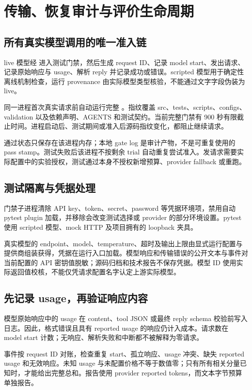 \section{传输、恢复审计与评价生命周期}
\subsection{所有真实模型调用的唯一准入链}
live 模型经  进入测试门禁，然后生成 request ID、记录 model start、发出请求、记录原始响应与 usage、解析 reply 并记录成功或错误。scripted 模型用于确定性离线机制检查，运行 provenance 由实际模型类型核验，不能通过文字字段伪装为 live。

同一进程首次真实请求前自动运行完整 。指纹覆盖 src、tests、scripts、configs、validation 以及依赖声明、AGENTS 和测试契约。当前完整门禁有 900 秒有限截止时间。进程启动后、测试期间或准入后源码指纹变化，都阻止继续请求。

通过状态只保存在该进程内存；本地 gate log 是审计产物，不是可重复使用的 pass stamp。测试失败后该进程不按剩余 trial 自动重复尝试准入。发请求需要实际配置中的实验授权，测试通过本身不授权新增预算、provider fallback 或重跑。

\subsection{测试隔离与凭据处理}
门禁子进程清除 API key、token、secret、password 等凭据环境项，禁用自动 pytest plugin 加载，并移除会改变测试选择或 provider 的部分环境设置。pytest 使用 scripted 模型、mock HTTP 及项目拥有的 loopback 夹具。

真实模型的 endpoint、model、temperature、超时及输出上限由显式运行配置与提供商组装获得，凭据在运行入口加载。模型响应和传输错误的公开文本与事件对当前配置的 API 密钥值脱敏；源码归档和技术报告不保存凭据。模型 ID 使用实际返回值校核，不能仅凭请求配置名字认定上游实际模型。

\subsection{先记录 usage，再验证响应内容}
模型原始响应中的 usage 在 content、tool JSON 或最终 reply schema 校验前写入日志。因此，格式错误且具有 reported usage 的响应仍计入成本。请求数在 model start 计数；无响应、解析失败和中断都不被解释为零请求。

事件按 request ID 对账，检查重复 start、孤立响应、usage 冲突、缺失 reported usage 和无效响应。未知 usage 与未配置价格不等于数值零；只有所有相关分量已知时，才能给出完整总和。报告使用 provider reported tokens，而文本字节预算单独报告。

